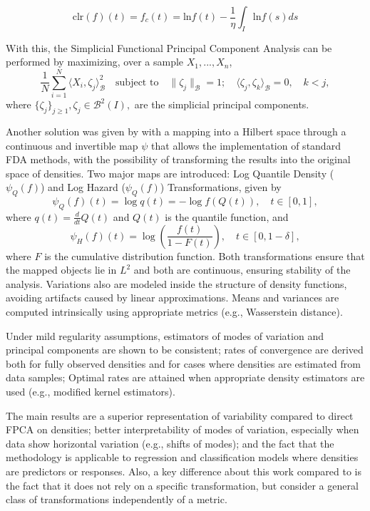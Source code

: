 \documentclass[
	12pt,				%
	oneside,			%
	a4paper,			%
	english,			%
	brazil				%
	]{abntex2ppgsi}
\begin{document}
\[
\text{clr}(f)(t)=f_c(t)=\text{ln}f(t)-\frac{1}{\eta}\int_{I}\text{ln}f(s)ds
\]

With this, the Simplicial Functional Principal Component Analysis can be performed by maximizing, over a sample $X_1, ...,X_n$,
\[
\frac{1}{N} \sum_{i=1}^{N} \langle X_i, \zeta_j \rangle_{\mathcal{B}}^2 
\quad \text{subject to} \quad \|\zeta_j\|_{\mathcal{B}} = 1; \quad \langle \zeta_j, \zeta_k \rangle_{\mathcal{B}} = 0, \quad k < j,
\]
where $\{\zeta_j\}_{j\geq1},\zeta_j \in \mathcal{B}^2(I),$ are the simplicial principal components.

Another solution was given by  with a mapping into a Hilbert space through a continuous and invertible map $\psi$ that allows the implementation of standard FDA methods, with the possibility of transforming the results into the original space of densities. Two major maps are introduced: Log Quantile Density ($\psi_Q(f)$) and Log Hazard ($\psi_Q(f)$) Transformations, given by
\[
\psi_Q(f)(t) = \log q(t) = -\log f(Q(t)), \quad t \in [0,1],
\]
where $q(t) = \frac{d}{dt} Q(t)$ and $Q(t)$ is the quantile function, and
\[
    \psi_H(f)(t) = \log\left( \frac{f(t)}{1 - F(t)} \right), \quad t \in [0,1-\delta],
\]
where $F$ is the cumulative distribution function. Both transformations ensure that the mapped objects lie in $L^2$ and both are continuous, ensuring stability of the analysis. Variations also are modeled inside the structure of density functions, avoiding artifacts caused by linear approximations. Means and variances are computed intrinsically using appropriate metrics (e.g., Wasserstein distance).

Under mild regularity assumptions, estimators of modes of variation and principal components are shown to be consistent; rates of convergence are derived both for fully observed densities and for cases where densities are estimated from data samples; Optimal rates are attained when appropriate density estimators are used (e.g., modified kernel estimators).

The main results are a superior representation of variability compared to direct FPCA on densities; better interpretability of modes of variation, especially when data show horizontal variation (e.g., shifts of modes); and the fact that the methodology is applicable to regression and classification models where densities are predictors or responses. Also, a key difference about this work compared to  is the fact that it does not rely on a specific transformation, but consider a general class of transformations independently of a metric. 
\end{document}

